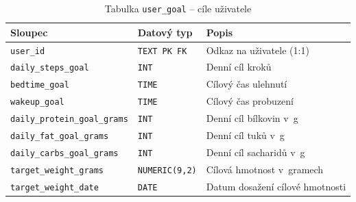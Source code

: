 \begin{table}[htbp]
    \centering
    \caption{Tabulka \texttt{user\_goal} -- cíle uživatele}
    \label{tab:user-goal}
    \begin{tabular}{|p{4.8cm}|p{3.0cm}|p{6.4cm}|}
        \hline
        \textbf{Sloupec}                     & \textbf{Datový typ}   & \textbf{Popis}                  \\
        \hline
        \texttt{user\_id}                    & \texttt{TEXT PK FK}   & Odkaz na uživatele (1:1)        \\
        \hline
        \texttt{daily\_steps\_goal}          & \texttt{INT}          & Denní cíl kroků                 \\
        \hline
        \texttt{bedtime\_goal}               & \texttt{TIME}         & Cílový čas ulehnutí             \\
        \hline
        \texttt{wakeup\_goal}                & \texttt{TIME}         & Cílový čas probuzení            \\
        \hline
        \texttt{daily\_protein\_goal\_grams} & \texttt{INT}          & Denní cíl bílkovin v~g          \\
        \hline
        \texttt{daily\_fat\_goal\_grams}     & \texttt{INT}          & Denní cíl tuků v~g              \\
        \hline
        \texttt{daily\_carbs\_goal\_grams}   & \texttt{INT}          & Denní cíl sacharidů v~g         \\
        \hline
        \texttt{target\_weight\_grams}       & \texttt{NUMERIC(9,2)} & Cílová hmotnost v~gramech       \\
        \hline
        \texttt{target\_weight\_date}        & \texttt{DATE}         & Datum dosažení cílové hmotnosti \\
        \hline
    \end{tabular}
\end{table}